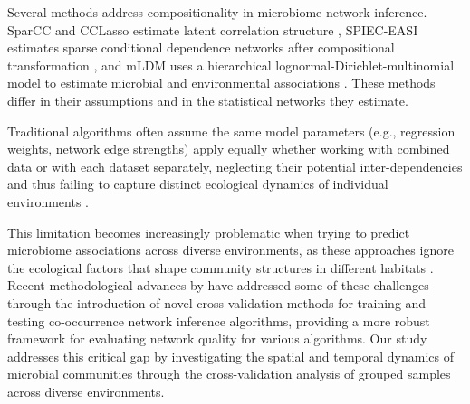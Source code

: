 \documentclass[]{Liebert_Author_revised}
\begin{document}
Several methods address compositionality in microbiome network inference.
SparCC and CCLasso estimate latent correlation structure \citep{friedman2012sparcc,fang2015cclasso}, SPIEC-EASI estimates sparse conditional dependence networks after compositional transformation \citep{Kurtz2015}, and mLDM uses a hierarchical lognormal-Dirichlet-multinomial model to estimate microbial and environmental associations \citep{yang2017mldm}.
These methods differ in their assumptions and in the statistical networks they estimate.

Traditional algorithms often assume the same model parameters (e.g., regression weights, network edge strengths) apply equally whether working with combined data or with each dataset separately, neglecting their potential inter-dependencies and thus failing to capture distinct ecological dynamics of individual environments \citep{knights2011bayesian,marcos2021applications}.

This limitation becomes increasingly problematic when trying to predict microbiome associations across diverse environments, as these approaches ignore the ecological factors that shape community structures in different habitats \citep{costello2012application}.
Recent methodological advances by \citet{agyapong2025cross} have addressed some of these challenges through the introduction of novel cross-validation methods for training and testing co-occurrence network inference algorithms, providing a more robust framework for evaluating network quality for various algorithms.
Our study addresses this critical gap by investigating the spatial and temporal dynamics of microbial communities through the cross-validation analysis of grouped samples across diverse environments.
\end{document}
